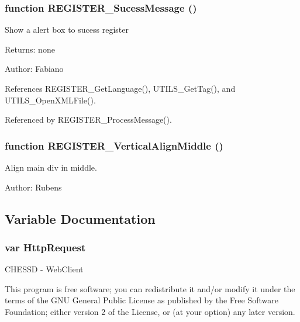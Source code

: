 \subsubsection{\setlength{\rightskip}{0pt plus 5cm}function REGISTER\_\-SucessMessage ()}\label{register_8js_f16ca40e345d5c80f16a10b57e8b5707}


Show a alert box to sucess register

\begin{Desc}
\item[Returns:]none \end{Desc}
\begin{Desc}
\item[Author:]Fabiano \end{Desc}


References REGISTER\_\-GetLanguage(), UTILS\_\-GetTag(), and UTILS\_\-OpenXMLFile().

Referenced by REGISTER\_\-ProcessMessage().
\subsubsection{\setlength{\rightskip}{0pt plus 5cm}function REGISTER\_\-VerticalAlignMiddle ()}\label{register_8js_4862cc46ed6cf1f2ec985a1339f0e0ef}


Align main div in middle. 

\begin{Desc}
\item[Author:]Rubens \end{Desc}


\subsection{Variable Documentation}
\subsubsection{\setlength{\rightskip}{0pt plus 5cm}var {\bf HttpRequest}}\label{register_8js_7766c35e097d0534a3567286da65c2d2}


CHESSD - WebClient

This program is free software; you can redistribute it and/or modify it under the terms of the GNU General Public License as published by the Free Software Foundation; either version 2 of the License, or (at your option) any later version.

